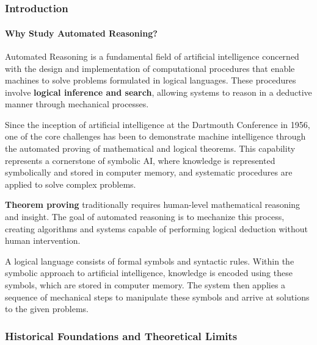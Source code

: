 \documentclass[11pt,a4paper]{article}
\theoremstyle{definition}
\theoremstyle{plain}
\theoremstyle{remark}
\begin{document}
\newpage
\tableofcontents
\newpage

\part{}


\section{Introduction}

\subsection{Why Study Automated Reasoning?}

Automated Reasoning is a fundamental field of artificial intelligence concerned with the design and implementation of computational procedures that enable machines to solve problems formulated in logical languages. These procedures involve \textbf{logical inference and search}, allowing systems to reason in a deductive manner through mechanical processes.

Since the inception of artificial intelligence at the Dartmouth Conference in 1956, one of the core challenges has been to demonstrate machine intelligence through the automated proving of mathematical and logical theorems. This capability represents a cornerstone of symbolic AI, where knowledge is represented symbolically and stored in computer memory, and systematic procedures are applied to solve complex problems.

\textbf{Theorem proving} traditionally requires human-level mathematical reasoning and insight. The goal of automated reasoning is to mechanize this process, creating algorithms and systems capable of performing logical deduction without human intervention.

A logical language consists of formal symbols and syntactic rules. Within the symbolic approach to artificial intelligence, knowledge is encoded using these symbols, which are stored in computer memory. The system then applies a sequence of mechanical steps to manipulate these symbols and arrive at solutions to the given problems.



\newpage

\section{Historical Foundations and Theoretical Limits}
\end{document}
